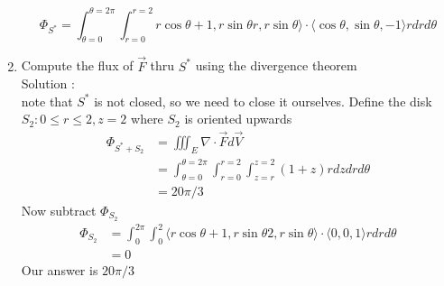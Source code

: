 \documentclass[11pt]{article}
\begin{document}
\begin{enumerate}
              \[\Phi_{S^{*}} = \int_{\theta = 0}^{\theta = 2\pi} \int_{r=0}^{r=2} r\cos\theta + 1, r\sin\theta r, r\sin\theta \rangle \cdot \langle \cos\theta, \sin\theta, -1 \rangle r dr d\theta\]
        \item Compute the flux of $\vec{F}$ thru $S^{*}$ using the divergence theorem\\
              Solution : \\
              note that $S^{*}$ is not closed, so we need to close it ourselves. Define the disk $S_{2} : 0 \le r \le 2, z = 2$ where $S_{2}$ is oriented upwards
              \begin{align*}
                \Phi_{S^{*} + S_{2}}
                &= \iiint_{E} \nabla \cdot \vec{F} d\vec{V} \\
                &=\int_{\theta = 0}^{\theta = 2\pi}\int_{r= 0}^{r=2}\int_{z = r}^{z=2} (1 + z) r dz dr d\theta \\
                &= 20\pi  / 3
              \end{align*}
              Now subtract $\Phi_{S_{2}}$
              \begin{align*}
                \Phi_{S_{2}}
                &= \int_{0}^{2\pi} \int_{0}^{2} \langle r\cos\theta + 1, r\sin\theta 2 , r\sin\theta \rangle \cdot \langle 0, 0, 1 \rangle r dr d\theta\\
                &= 0
                \end{align*}
              Our answer is $20\pi/3$
      \end{enumerate}
\end{document}
